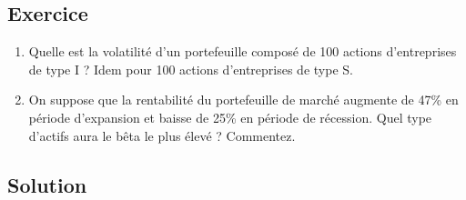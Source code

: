 \documentclass[a4paper, 12pt]{report}
\begin{document}
\subsection{Exercice}

\begin{enumerate}
	\item Quelle est la volatilité d'un portefeuille composé de 100 actions d'entreprises de type I ? Idem  pour 100 actions d'entreprises de type S.
	\item On suppose que la rentabilité du portefeuille de marché augmente de 47\% en période d'expansion et baisse de 25\% en période de récession.  Quel type d'actifs aura le bêta le plus élevé ? Commentez.
\end{enumerate}

\subsection{Solution}
\end{document}
